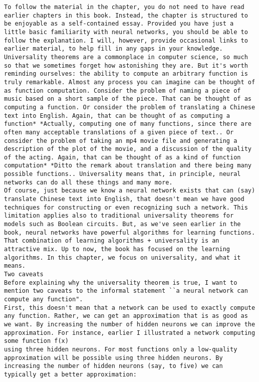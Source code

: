 \begin{lstlisting}
To follow the material in the chapter, you do not need to have read earlier chapters in this book. Instead, the chapter is structured to be enjoyable as a self-contained essay. Provided you have just a little basic familiarity with neural networks, you should be able to follow the explanation. I will, however, provide occasional links to earlier material, to help fill in any gaps in your knowledge.
Universality theorems are a commonplace in computer science, so much so that we sometimes forget how astonishing they are. But it's worth reminding ourselves: the ability to compute an arbitrary function is truly remarkable. Almost any process you can imagine can be thought of as function computation. Consider the problem of naming a piece of music based on a short sample of the piece. That can be thought of as computing a function. Or consider the problem of translating a Chinese text into English. Again, that can be thought of as computing a function* *Actually, computing one of many functions, since there are often many acceptable translations of a given piece of text.. Or consider the problem of taking an mp4 movie file and generating a description of the plot of the movie, and a discussion of the quality of the acting. Again, that can be thought of as a kind of function computation* *Ditto the remark about translation and there being many possible functions.. Universality means that, in principle, neural networks can do all these things and many more.
Of course, just because we know a neural network exists that can (say) translate Chinese text into English, that doesn't mean we have good techniques for constructing or even recognizing such a network. This limitation applies also to traditional universality theorems for models such as Boolean circuits. But, as we've seen earlier in the book, neural networks have powerful algorithms for learning functions. That combination of learning algorithms + universality is an attractive mix. Up to now, the book has focused on the learning algorithms. In this chapter, we focus on universality, and what it means.
Two caveats
Before explaining why the universality theorem is true, I want to mention two caveats to the informal statement ``a neural network can compute any function".
First, this doesn't mean that a network can be used to exactly compute any function. Rather, we can get an approximation that is as good as we want. By increasing the number of hidden neurons we can improve the approximation. For instance, earlier I illustrated a network computing some function f(x)
using three hidden neurons. For most functions only a low-quality approximation will be possible using three hidden neurons. By increasing the number of hidden neurons (say, to five) we can typically get a better approximation:

\end{lstlisting}
